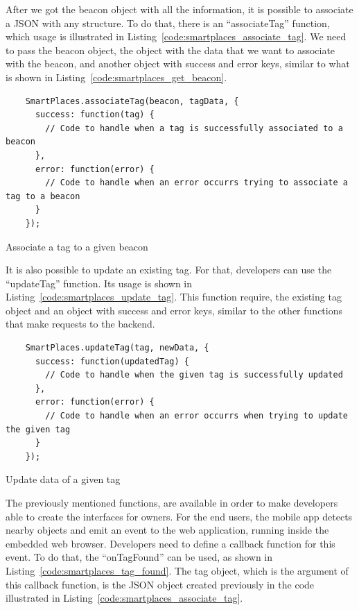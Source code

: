 After we got the beacon object with all the information, it is possible to associate a \gls{JSON} with any structure.
To do that, there is an ``associateTag'' function, which usage is illustrated in Listing~\ref{code:smartplaces_associate_tag}. We need to pass the beacon object, the object with the data that we want to associate with the beacon, and another object with success and error keys, similar to what is shown in Listing~\ref{code:smartplaces_get_beacon}.

\begin{listing}[H]
  \begin{verbatim}
    SmartPlaces.associateTag(beacon, tagData, {
      success: function(tag) {
        // Code to handle when a tag is successfully associated to a beacon
      },
      error: function(error) {
        // Code to handle when an error occurrs trying to associate a tag to a beacon
      }
    });
  \end{verbatim}
  \caption[Associate tag]{Associate a tag to a given beacon}
  \label{code:smartplaces_associate_tag}
\end{listing}

It is also possible to update an existing tag. For that, developers can use the ``updateTag'' function. Its usage is shown in Listing~\ref{code:smartplaces_update_tag}. This function require, the existing tag object and an object with success and error keys, similar to the other functions that make requests to the backend.

\begin{listing}[H]
  \begin{verbatim}
    SmartPlaces.updateTag(tag, newData, {
      success: function(updatedTag) {
        // Code to handle when the given tag is successfully updated
      },
      error: function(error) {
        // Code to handle when an error occurrs when trying to update the given tag
      }
    });
  \end{verbatim}
  \caption[Update an existing tag]{Update data of a given tag}
  \label{code:smartplaces_update_tag}
\end{listing}

The previously mentioned functions, are available in order to make developers able to create the interfaces for owners.
For the end users, the mobile app detects nearby objects and emit an event to the web application, running inside the embedded web browser.
Developers need to define a callback function for this event.
To do that, the ``onTagFound'' can be used, as shown in Listing~\ref{code:smartplaces_tag_found}.
The tag object, which is the argument of this callback function, is the \gls{JSON} object created previously in the code illustrated in Listing~\ref{code:smartplaces_associate_tag}.

